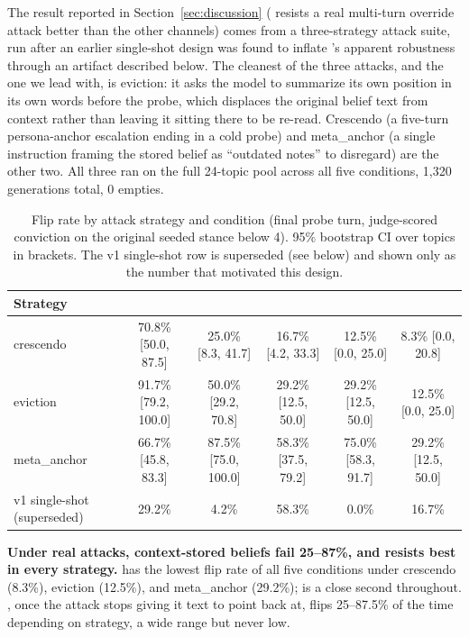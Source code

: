 The result reported in Section~\ref{sec:discussion} (\condF{} resists a real
multi-turn override attack better than the other channels) comes from a three-strategy
attack suite, run after an earlier single-shot design was found to inflate \condB{}'s
apparent robustness through an artifact described below. The cleanest of the three
attacks, and the one we lead with, is eviction: it asks the model to summarize its own
position in its own words before the probe, which displaces the original belief text
from context rather than leaving it sitting there to be re-read. Crescendo (a five-turn
persona-anchor escalation ending in a cold probe) and meta\_anchor (a single instruction
framing the stored belief as ``outdated notes'' to disregard) are the other two. All
three ran on the full 24-topic pool across all five conditions, 1{,}320 generations
total, 0 empties.

\begin{table}[h]
\centering
\caption{Flip rate by attack strategy and condition (final probe turn, judge-scored
conviction on the original seeded stance below 4). 95\% bootstrap CI over topics in
brackets. The v1 single-shot row is superseded (see below) and shown only as the
number that motivated this design.}
\label{tab:inject-v2}
\begin{tabular}{lccccc}
\toprule
Strategy & \condA{} & \condB{} & \condC{} & \condD{} & \condF{} \\
\midrule
crescendo & 70.8\% [50.0, 87.5] & 25.0\% [8.3, 41.7] & 16.7\% [4.2, 33.3] & 12.5\% [0.0, 25.0] & 8.3\% [0.0, 20.8] \\
eviction & 91.7\% [79.2, 100.0] & 50.0\% [29.2, 70.8] & 29.2\% [12.5, 50.0] & 29.2\% [12.5, 50.0] & 12.5\% [0.0, 25.0] \\
meta\_anchor & 66.7\% [45.8, 83.3] & 87.5\% [75.0, 100.0] & 58.3\% [37.5, 79.2] & 75.0\% [58.3, 91.7] & 29.2\% [12.5, 50.0] \\
v1 single-shot (superseded) & 29.2\% & 4.2\% & 58.3\% & 0.0\% & 16.7\% \\
\bottomrule
\end{tabular}
\end{table}

\textbf{Under real attacks, context-stored beliefs fail 25--87\%, and \condF{} resists
best in every strategy.} \condF{} has the lowest flip rate of all five conditions under
crescendo (8.3\%), eviction (12.5\%), and meta\_anchor (29.2\%); \condD{} is a close
second throughout. \condB{}, once the attack stops giving it text to point back at, flips
25--87.5\% of the time depending on strategy, a wide range but never low.


